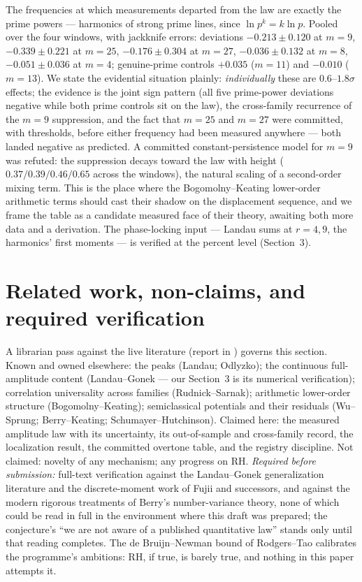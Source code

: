 \documentclass[11pt]{article}
\theoremstyle{definition}
\theoremstyle{remark}
\begin{document}
The frequencies at which measurements departed from the law are exactly the prime powers ---
harmonics of strong prime lines, since $\ln p^k = k \ln p$. Pooled over the four windows, with
jackknife errors: deviations $-0.213 \pm 0.120$ at $m = 9$, $-0.339 \pm 0.221$ at $m = 25$,
$-0.176 \pm 0.304$ at $m = 27$, $-0.036 \pm 0.132$ at $m = 8$, $-0.051 \pm 0.036$ at $m = 4$;
genuine-prime controls $+0.035$ ($m = 11$) and $-0.010$ ($m = 13$). We state the evidential
situation plainly: \emph{individually} these are $0.6$--$1.8\sigma$ effects; the evidence is the
joint sign pattern (all five prime-power deviations negative while both prime controls sit on the
law), the cross-family recurrence of the $m = 9$ suppression, and the fact that $m = 25$ and
$m = 27$ were committed, with thresholds, before either frequency had been measured anywhere ---
both landed negative as predicted. A committed constant-persistence model for $m = 9$ was refuted:
the suppression decays toward the law with height ($0.37/0.39/0.46/0.65$ across the windows), the
natural scaling of a second-order mixing term. This is the place where the Bogomolny--Keating
lower-order arithmetic terms \cite{BK1,BK2} should cast their shadow on the displacement sequence,
and we frame the table as a candidate measured face of their theory, awaiting both more data and a
derivation. The phase-locking input --- Landau sums at $r = 4, 9$, the harmonics' first moments ---
is verified at the percent level (Section~3).

\section{Related work, non-claims, and required verification}

A librarian pass against the live literature (report in \cite{Code}) governs this section. Known
and owned elsewhere: the peaks (Landau; Odlyzko); the continuous full-amplitude content
(Landau--Gonek --- our Section~3 is its numerical verification); correlation universality across
families (Rudnick--Sarnak); arithmetic lower-order structure (Bogomolny--Keating); semiclassical
potentials and their residuals (Wu--Sprung; Berry--Keating; Schumayer--Hutchinson). Claimed here:
the measured amplitude law with its uncertainty, its out-of-sample and cross-family record, the
localization result, the committed overtone table, and the registry discipline. Not claimed:
novelty of any mechanism; any progress on RH. \emph{Required before submission:} full-text
verification against the Landau--Gonek generalization literature and the discrete-moment work of
Fujii \cite{Fujii1,Fujii2} and successors, and against the modern rigorous treatments of Berry's
number-variance theory, none of which could be read in full in the environment where this draft
was prepared; the conjecture's ``we are not aware of a published quantitative law'' stands only
until that reading completes. The de Bruijn--Newman bound of Rodgers--Tao \cite{RodgersTao}
calibrates the programme's ambitions: RH, if true, is barely true, and nothing in this paper
attempts it.
\end{document}
